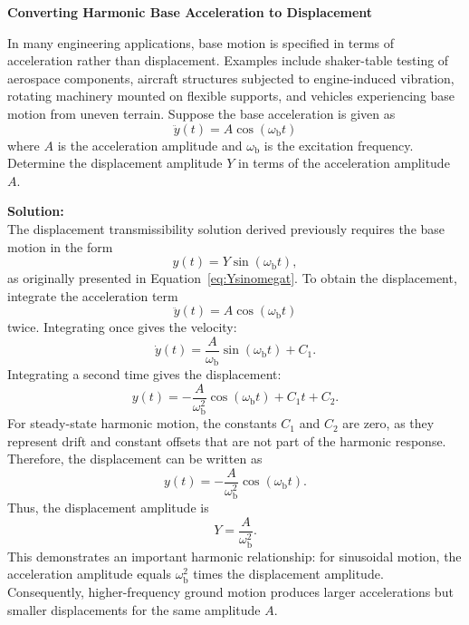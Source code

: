 \documentclass[12pt,letter]{article}
\begin{document}
\begin{example}
\label{ex:Acceleration_to_Displacement}
\textbf{Converting Harmonic Base Acceleration to Displacement}

\noindent In many engineering applications, base motion is specified in terms of acceleration rather than displacement. Examples include shaker-table testing of aerospace components, aircraft structures subjected to engine-induced vibration, rotating machinery mounted on flexible supports, and vehicles experiencing base motion from uneven terrain.
Suppose the base acceleration is given as
\begin{equation}
\ddot{y}(t) = A \cos(\omega_\text{b} t)
\end{equation}
where $A$ is the acceleration amplitude and $\omega_\text{b}$ is the excitation frequency. Determine the displacement amplitude $Y$ in terms of the acceleration amplitude $A$.

\noindent\textbf{Solution:} \\
 The displacement transmissibility solution derived previously requires the base motion in the form
\begin{equation}
y(t) = Y \sin(\omega_\text{b} t),
\end{equation}
as originally presented in Equation~\ref{eq:Ysinomegat}. To obtain the displacement, integrate the acceleration term 
\begin{equation}
\ddot{y}(t) = A \cos(\omega_\text{b} t)
\end{equation}
twice. Integrating once gives the velocity:
\begin{equation}
\dot{y}(t) = \frac{A}{\omega_\text{b}} \sin(\omega_\text{b} t) + C_1.
\end{equation}
Integrating a second time gives the displacement:
\begin{equation}
y(t) = -\frac{A}{\omega_\text{b}^2} \cos(\omega_\text{b} t) + C_1 t + C_2.
\end{equation}
For steady-state harmonic motion, the constants $C_1$ and $C_2$ are zero, as they represent drift and constant offsets that are not part of the harmonic response. Therefore, the displacement can be written as
\begin{equation}
y(t) = -\frac{A}{\omega_\text{b}^2} \cos(\omega_\text{b} t).
\end{equation}
Thus, the displacement amplitude is
\begin{equation}
Y = \frac{A}{\omega_\text{b}^2}.
\end{equation}
This demonstrates an important harmonic relationship: for sinusoidal motion, the acceleration amplitude equals $\omega_\text{b}^2$ times the displacement amplitude. Consequently, higher-frequency ground motion produces larger accelerations but smaller displacements for the same amplitude $A$.
\end{example}
\end{document}
